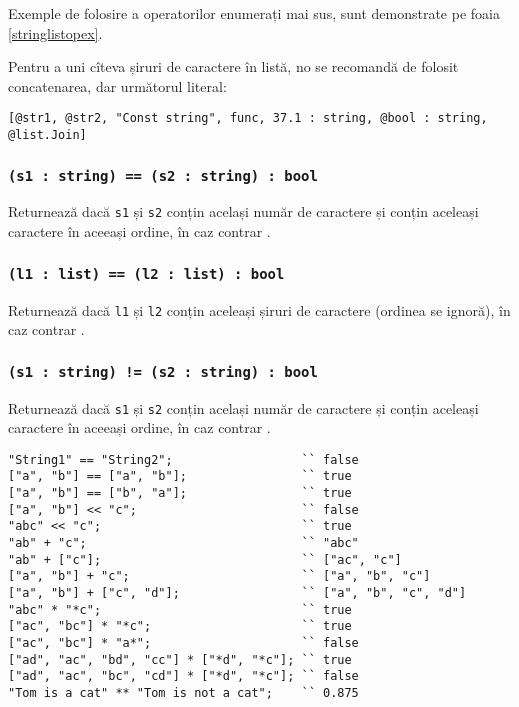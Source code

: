 Exemple de folosire a operatorilor enumerați mai sus, sunt demonstrate pe foaia \ref{stringlistopex}.

Pentru a uni cîteva șiruri de caractere în listă, no se recomandă de folosit concatenarea, dar următorul literal:
\begin{verbatim}
[@str1, @str2, "Const string", func, 37.1 : string, @bool : string, @list.Join]
\end{verbatim}

\subsubsection{\texttt{(s1 : string) == (s2 : string) : bool}}

Returnează \true{} dacă \texttt{s1} și \texttt{s2} conțin același număr de caractere și conțin aceleași caractere în aceeași ordine, în caz contrar \false{}.

\subsubsection{\texttt{(l1 : list) == (l2 : list) : bool}}

Returnează \true{} dacă \texttt{l1} și \texttt{l2} conțin aceleași șiruri de caractere (ordinea se ignoră), în caz contrar \false{}.

\subsubsection{\texttt{(s1 : string) != (s2 : string) : bool}}

Returnează \false{} dacă \texttt{s1} și \texttt{s2} conțin același număr de caractere și conțin aceleași caractere în aceeași ordine, în caz contrar \true{}.

\begin{sourcecode}
\label{stringlistopex}
\begin{verbatim}
"String1" == "String2";					 `` false
["a", "b"] == ["a", "b"];				 `` true
["a", "b"] == ["b", "a"];				 `` true
["a", "b"] << "c";						 `` false
"abc" << "c";							 `` true
"ab" + "c";								 `` "abc"
"ab" + ["c"];							 `` ["ac", "c"]
["a", "b"] + "c";						 `` ["a", "b", "c"]
["a", "b"] + ["c", "d"];				 `` ["a", "b", "c", "d"]
"abc" * "*c";							 `` true
["ac", "bc"] * "*c";					 `` true
["ac", "bc"] * "a*";					 `` false
["ad", "ac", "bd", "cc"] * ["*d", "*c"]; `` true
["ad", "ac", "bc", "cd"] * ["*d", "*c"]; `` false
"Tom is a cat" ** "Tom is not a cat";	 `` 0.875
\end{verbatim}
\end{sourcecode}

